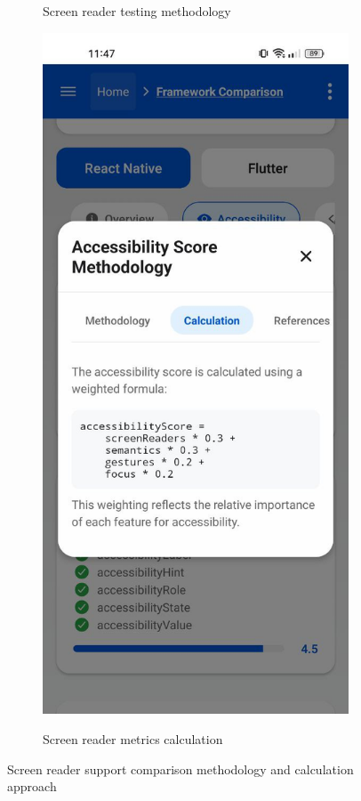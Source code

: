 \begin{figure}[ht]
\begin{subfigure}[b]{0.48\textwidth}
        \caption{Screen reader testing methodology}
        \label{fig:screen-reader-methodology}
    \end{subfigure}
    \hfill
    \begin{subfigure}[b]{0.48\textwidth}
        \centering
        \includegraphics[width=\linewidth, alt={Screen reader support metrics calculation}]{img/accessibility-calculation.jpg}
        \caption{Screen reader metrics calculation}
        \label{fig:screen-reader-calculation}
    \end{subfigure}
    \caption{Screen reader support comparison methodology and calculation approach}
    \label{fig:screen_reader_methodology}
\end{figure}

